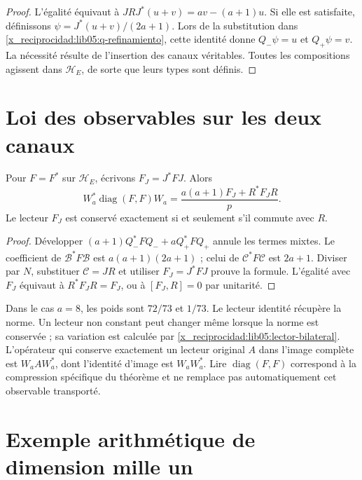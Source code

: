 \begin{proof}
L’égalité équivaut à
\(JRJ^*(u+v)=av-(a+1)u\). Si elle est satisfaite, définissons
\(\psi=J^*(u+v)/(2a+1)\). Lors de la substitution dans
\eqref{x_reciprocidad:lib05:q-refinamiento}, cette identité donne
\(Q_-\psi=u\) et \(Q_+\psi=v\). La nécessité résulte de
l’insertion des canaux véritables. Toutes les compositions agissent
dans \(\mathscr H_E\), de sorte que leurs types sont définis.
\end{proof}

\section{Loi des observables sur les deux canaux}
\label{x_reciprocidad:lib05:ley-lectores}

\begin{theorem}
\label{x_reciprocidad:lib05:teo-lector}
Pour \(F=F^*\) sur \(\mathscr H_E\), écrivons
\(F_J=J^*FJ\). Alors
\begin{equation}
 W_a^*\operatorname{diag}(F,F)W_a
 =\frac{a(a+1)F_J+R^*F_JR}{p}.
 \label{x_reciprocidad:lib05:lector-bilateral}
\end{equation}
Le lecteur \(F_J\) est conservé exactement si et seulement s'il commute avec \(R\).
\end{theorem}

\begin{proof}
Développer \((a+1)Q_-^*FQ_-+aQ_+^*FQ_+\) annule les
termes mixtes. Le coefficient de \(\mathcal B^*F\mathcal B\)
est \(a(a+1)(2a+1)\) ; celui de
\(\mathcal C^*F\mathcal C\) est \(2a+1\). Diviser par
\(N\), substituer \(\mathcal C=JR\) et utiliser
\(F_J=J^*FJ\) prouve la formule. L’égalité avec \(F_J\)
équivaut à \(R^*F_JR=F_J\), ou à \([F_J,R]=0\) par
unitarité.
\end{proof}

Dans le cas \(a=8\), les poids sont \(72/73\) et \(1/73\). Le lecteur identité récupère la norme. Un lecteur non constant peut changer même lorsque la norme est conservée ; sa variation est calculée par \eqref{x_reciprocidad:lib05:lector-bilateral}. L'opérateur qui conserve exactement un lecteur original \(A\) dans l'image complète est \(W_aAW_a^*\), dont l'identité d'image est \(W_aW_a^*\). Lire \(\operatorname{diag}(F,F)\) correspond à la compression spécifique du théorème et ne remplace pas automatiquement cet observable transporté.

\section{Exemple arithmétique de dimension mille un}
\label{x_reciprocidad:lib05:ejemplo}

